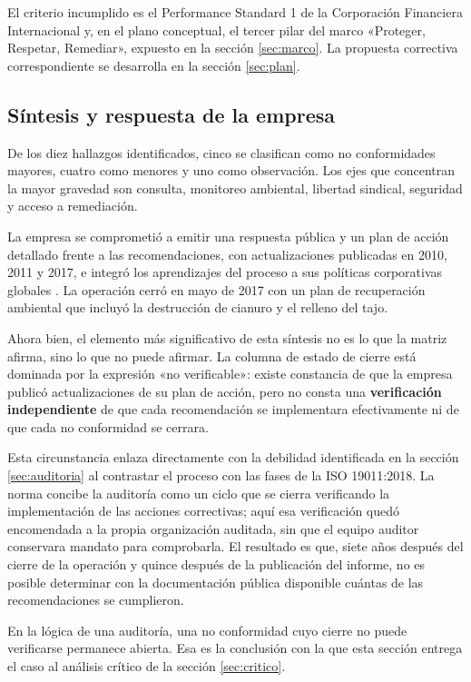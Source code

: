 El criterio incumplido es el Performance Standard 1 de la Corporación Financiera
Internacional y, en el plano conceptual, el tercer pilar del marco «Proteger,
Respetar, Remediar», expuesto en la sección \ref{sec:marco}. La propuesta
correctiva correspondiente se desarrolla en la sección \ref{sec:plan}.

\subsection{Síntesis y respuesta de la empresa}
\label{sec:sintesis}

De los diez hallazgos identificados, cinco se clasifican como no conformidades
mayores, cuatro como menores y uno como observación. Los ejes que concentran la
mayor gravedad son consulta, monitoreo ambiental, libertad sindical, seguridad y
acceso a remediación.

La empresa se comprometió a emitir una respuesta pública y un plan de acción
detallado frente a las recomendaciones, con actualizaciones publicadas en 2010,
2011 y 2017, e integró los aprendizajes del proceso a sus políticas corporativas
globales \parencite{oncommonground2010hria, goldcorp2023marlin}. La operación
cerró en mayo de 2017 con un plan de recuperación ambiental que incluyó la
destrucción de cianuro y el relleno del tajo.

Ahora bien, el elemento más significativo de esta síntesis no es lo que la matriz
afirma, sino lo que no puede afirmar. La columna de estado de cierre está dominada
por la expresión «no verificable»: existe constancia de que la empresa publicó
actualizaciones de su plan de acción, pero no consta una \textbf{verificación
independiente} de que cada recomendación se implementara efectivamente ni de que
cada no conformidad se cerrara.

Esta circunstancia enlaza directamente con la debilidad identificada en la sección
\ref{sec:auditoria} al contrastar el proceso con las fases de la ISO 19011:2018.
La norma concibe la auditoría como un ciclo que se cierra verificando la
implementación de las acciones correctivas; aquí esa verificación quedó
encomendada a la propia organización auditada, sin que el equipo auditor
conservara mandato para comprobarla. El resultado es que, siete años después del
cierre de la operación y quince después de la publicación del informe, no es
posible determinar con la documentación pública disponible cuántas de las
recomendaciones se cumplieron.

En la lógica de una auditoría, una no conformidad cuyo cierre no puede verificarse
permanece abierta. Esa es la conclusión con la que esta sección entrega el caso al
análisis crítico de la sección \ref{sec:critico}.
